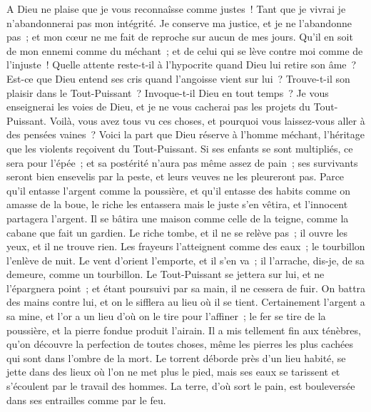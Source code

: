 \begin{multicols}{2}
A Dieu ne plaise que je vous reconnaîsse comme justes~! Tant que je vivrai je n'abandonnerai pas mon intégrité.
Je conserve ma justice, et je ne l'abandonne pas~; et mon cœur ne me fait de reproche sur aucun de mes jours.
Qu'il en soit de mon ennemi comme du méchant~; et de celui qui se lève contre moi comme de l'injuste~!
Quelle attente reste-t-il à l'hypocrite quand Dieu lui retire son âme~?
Est-ce que Dieu entend ses cris quand l'angoisse vient sur lui~?
Trouve-t-il son plaisir dans le Tout-Puissant~? Invoque-t-il Dieu en tout temps~?
Je vous enseignerai les voies de Dieu, et je ne vous cacherai pas les projets du Tout-Puissant.
Voilà, vous avez tous vu ces choses, et pourquoi vous laissez-vous aller à des pensées vaines~?
Voici la part que Dieu réserve à l'homme méchant, l'héritage que les violents reçoivent du Tout-Puissant.
Si ses enfants se sont multipliés, ce sera pour l'épée~; et sa postérité n'aura pas même assez de pain~;
ses survivants seront bien ensevelis par la peste, et leurs veuves ne les pleureront pas.
Parce qu'il entasse l'argent comme la poussière, et qu'il entasse des habits comme on amasse de la boue,
le riche les entassera mais le juste s'en vêtira, et l'innocent partagera l'argent.
Il se bâtira une maison comme celle de la teigne, comme la cabane que fait un gardien.
Le riche tombe, et il ne se relève pas~; il ouvre les yeux, et il ne trouve rien.
Les frayeurs l'atteignent comme des eaux~; le tourbillon l'enlève de nuit.
Le vent d'orient l'emporte, et il s'en va~; il l'arrache, dis-je, de sa demeure, comme un tourbillon.
 Le Tout-Puissant se jettera sur lui, et ne l'épargnera point~; et étant poursuivi par sa main, il ne cessera de fuir.
On battra des mains contre lui, et on le sifflera au lieu où il se tient.
\VerseOne{}Certainement l'argent a sa mine, et l'or a un lieu d'où on le tire pour l'affiner~;
le fer se tire de la poussière, et la pierre fondue produit l'airain.
Il a mis tellement fin aux ténèbres, qu'on découvre la perfection de toutes choses, même les pierres les plus cachées qui sont dans l'ombre de la mort.
Le torrent déborde près d'un lieu habité, se jette dans des lieux où l'on ne met plus le pied, mais ses eaux se tarissent et s'écoulent par le travail des hommes.
La terre, d'où sort le pain, est bouleversée dans ses entrailles comme par le feu.

\end{multicols}
